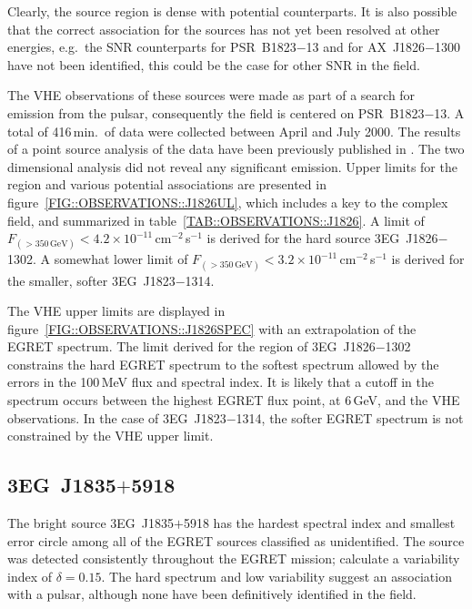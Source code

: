 Clearly, the source region is dense with potential counterparts. It is
also possible that the correct association for the sources has not yet
been resolved at other energies, e.g.\ the SNR counterparts for
PSR~B1823$-$13 and for AX~J1826$-$1300 have not been identified, this
could be the case for other SNR in the field. 

The VHE observations of these sources were made as part of a search
for emission from the pulsar, consequently the field is centered on
PSR~B1823$-$13. A total of 416\,min.\ of data were collected between
April and July 2000. The results of a point source analysis of the
data have been previously published in \citet{REF::HALL::ICRC2001,
REF::HALL::ICRC2003}. The two dimensional analysis did not reveal any
significant emission. Upper limits for the region and various
potential associations are presented in
figure~\ref{FIG::OBSERVATIONS::J1826UL}, which includes a key to the
complex field, and summarized in table~\ref{TAB::OBSERVATIONS::J1826}.
A limit of
$F_{(>350\,\mathrm{GeV})}<4.2\times10^{-11}$\,cm$^{-2}$\,s$^{-1}$ is
derived for the hard \Gray source 3EG~J1826$-$1302. A somewhat lower
limit of
$F_{(>350\,\mathrm{GeV})}<3.2\times10^{-11}$\,cm$^{-2}$\,s$^{-1}$ is
derived for the smaller, softer 3EG~J1823$-$1314.

The VHE upper limits are displayed in
figure~\ref{FIG::OBSERVATIONS::J1826SPEC} with an extrapolation of the
EGRET spectrum. The limit derived for the region of 3EG~J1826$-$1302
constrains the hard EGRET spectrum to the softest spectrum allowed by
the errors in the 100\,MeV flux and spectral index. It is likely that
a cutoff in the spectrum occurs between the highest EGRET flux point,
at 6\,GeV, and the VHE observations. In the case of 3EG~J1823$-$1314,
the softer EGRET spectrum is not constrained by the VHE upper limit.

\subsection{3EG~J1835$+$5918}

The bright \Gray source 3EG~J1835$+$5918 has the hardest spectral
index and smallest error circle among all of the EGRET sources
classified as unidentified. The source was detected consistently
throughout the EGRET mission; \citet{REF::NOLAN::APJ2003} calculate a
variability index of $\delta=0.15$. The hard spectrum and low
variability suggest an association with a pulsar, although none have
been definitively identified in the field.

